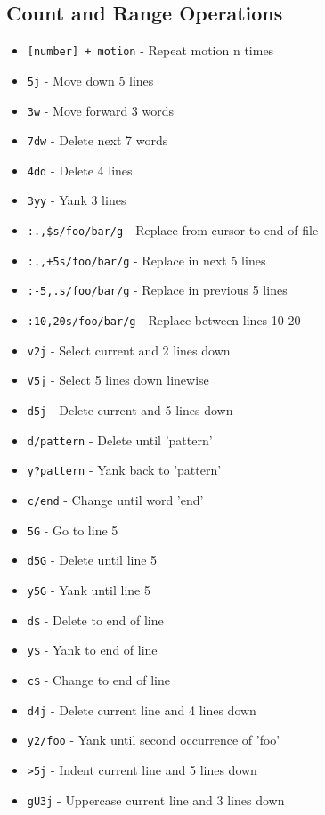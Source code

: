 \documentclass[6pt,landscape]{article}
\newcommand{\key}[1]{\texttt{#1}}
\begin{document}
\begin{multicols*}{5}
\section*{Count and Range Operations}
\begin{itemize}[leftmargin=*,itemsep=0pt,parsep=0pt,topsep=0pt]
\item \key{[number] + motion} - Repeat motion n times
\item \key{5j} - Move down 5 lines
\item \key{3w} - Move forward 3 words
\item \key{7dw} - Delete next 7 words
\item \key{4dd} - Delete 4 lines
\item \key{3yy} - Yank 3 lines

\item \key{:.,\$s/foo/bar/g} - Replace from cursor to end of file
\item \key{:.,+5s/foo/bar/g} - Replace in next 5 lines
\item \key{:-5,.s/foo/bar/g} - Replace in previous 5 lines
\item \key{:10,20s/foo/bar/g} - Replace between lines 10-20

\item \key{v2j} - Select current and 2 lines down
\item \key{V5j} - Select 5 lines down linewise
\item \key{d5j} - Delete current and 5 lines down

\item \key{d/pattern} - Delete until 'pattern'
\item \key{y?pattern} - Yank back to 'pattern'
\item \key{c/end} - Change until word 'end'

\item \key{5G} - Go to line 5
\item \key{d5G} - Delete until line 5
\item \key{y5G} - Yank until line 5
\item \key{d\$} - Delete to end of line
\item \key{y\$} - Yank to end of line
\item \key{c\$} - Change to end of line

\item \key{d4j} - Delete current line and 4 lines down
\item \key{y2/foo} - Yank until second occurrence of 'foo'
\item \key{>5j} - Indent current line and 5 lines down
\item \key{gU3j} - Uppercase current line and 3 lines down
\end{itemize}


\end{multicols*}
\end{document}
